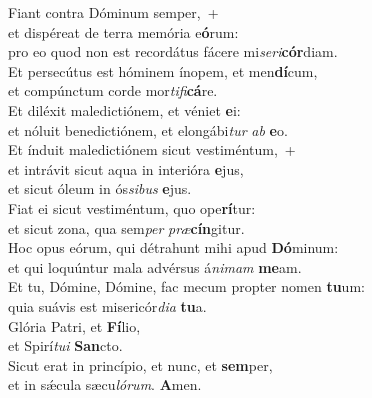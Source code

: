 \evenverse Fiant contra Dóminum semper,~+\\\evenverse  et dispéreat de terra memória e\textbf{ó}rum:~\*\\
\evenverse pro eo quod non est recordátus fácere mi\textit{se}\textit{ri}\textbf{cór}diam.\\
\oddverse Et persecútus est hóminem ínopem, et men\textbf{dí}cum,~\*\\
\oddverse et compúnctum corde mor\textit{ti}\textit{fi}\textbf{cá}re.\\
\evenverse Et diléxit maledictiónem, et véniet \textbf{e}i:~\*\\
\evenverse et nóluit benedictiónem, et elongábi\textit{tur} \textit{ab} \textbf{e}o.\\
\oddverse Et índuit maledictiónem sicut vestiméntum,~+\\
\oddverse  et intrávit sicut aqua in interióra \textbf{e}jus,~\*\\
\oddverse et sicut óleum in ós\textit{si}\textit{bus} \textbf{e}jus.\\
\evenverse Fiat ei sicut vestiméntum, quo ope\textbf{rí}tur:~\*\\
\evenverse et sicut zona, qua sem\textit{per} \textit{præ}\textbf{cín}gitur.\\
\oddverse Hoc opus eórum, qui détrahunt mihi apud \textbf{Dó}minum:~\*\\
\oddverse et qui loquúntur mala advérsus á\textit{ni}\textit{mam} \textbf{me}am.\\
\evenverse Et tu, Dómine, Dómine, fac mecum propter nomen \textbf{tu}um:~\*\\
\evenverse quia suávis est misericór\textit{di}\textit{a} \textbf{tu}a.\\
\oddverse Glória Patri, et \textbf{Fí}lio,~\*\\
\oddverse et Spirí\textit{tu}\textit{i} \textbf{San}cto.\\
\evenverse Sicut erat in princípio, et nunc, et \textbf{sem}per,~\*\\
\evenverse et in sǽcula sæcu\textit{ló}\textit{rum}. \textbf{A}men.\\

